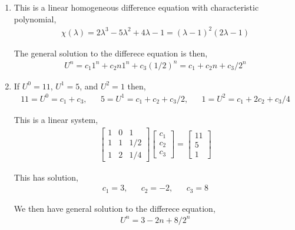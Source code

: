 \documentclass[10pt]{article}
\begin{document}
\begin{solution}[Solution]

\begin{enumerate}[label=(\alph*)]
    \item This is a linear homogeneous difference equation with characteristic polynomial,
    \begin{align*}
        \chi(\lambda) = 2\lambda^3 - 5\lambda^2 + 4\lambda  - 1
        = (\lambda-1)^2(2\lambda-1)
    \end{align*}

    The general solution to the differece equation is then,
    \begin{align*}
        U^n = c_1 1^n + c_2 n 1^n + c_3 (1/2)^n = c_1 + c_2 n  + c_3/2^n
    \end{align*}

    \item If \( U^0 = 11 \), \( U^1 = 5 \), and \( U^2 = 1 \) then,
    \begin{align*}
        11 = U^0 = c_1 + c_3, && 5 = U^1 = c_1 + c_2 + c_3/2, && 1 = U^2 = c_1+2c_2 + c_3/4
    \end{align*}

    This is a linear system,
    \begin{align*}
        \left[\begin{array}{ccc}
            1 & 0 & 1 \\
            1 & 1 & 1/2 \\
            1 & 2 & 1/4
        \end{array}\right]
        \left[\begin{array}{c}c_1 \\ c_2 \\ c_3 \end{array}\right]
        =
        \left[\begin{array}{c}11 \\ 5 \\ 1\end{array}\right]
    \end{align*}

    This has solution,
    \begin{align*}
        c_1 = 3,
        && c_2 = -2,
        && c_3 = 8
    \end{align*}

    We then have general solution to the differece equation,
    \begin{align*}
        U^n = 3 - 2n + 8/2^n
    \end{align*}


\end{enumerate}
\end{solution}
\end{document}
